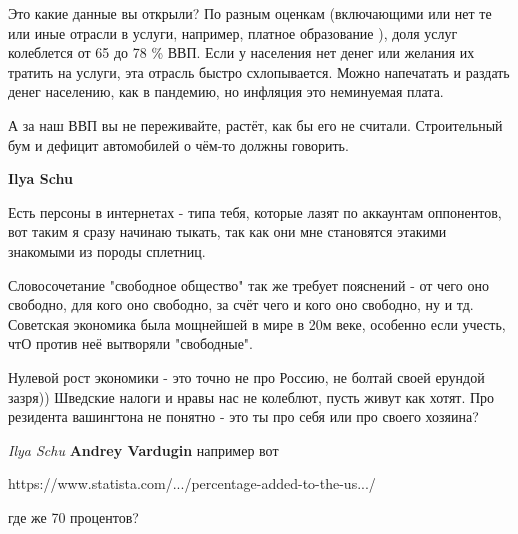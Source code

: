 \begin{itemize}
\begin{itemize}

Это какие данные вы открыли? По разным оценкам (включающими или нет те или иные
отрасли в услуги, например, платное образование ), доля услуг колеблется от 65
до 78 \% ВВП. Если у населения нет денег или желания их тратить на услуги, эта
отрасль быстро схлопывается. Можно напечатать и раздать денег населению, как в
пандемию, но инфляция это неминуемая плата.

А за наш ВВП вы не переживайте, растёт, как бы его не считали. Строительный бум
и дефицит автомобилей о чём-то должны говорить.

\textbf{Ilya Schu} 

Есть персоны в интернетах - типа тебя, которые лазят по аккаунтам оппонентов,
вот таким я сразу начинаю тыкать, так как они мне становятся этакими знакомыми
из породы сплетниц.

Словосочетание "свободное общество" так же требует пояснений - от чего оно
свободно, для кого оно свободно, за счёт чего и кого оно свободно, ну и тд.
Советская экономика была мощнейшей в мире в 20м веке, особенно если учесть, чтО
против неё вытворяли "свободные".

Нулевой рост экономики - это точно не про Россию, не болтай своей ерундой
зазря)) Шведские налоги и нравы нас не колеблют, пусть живут как хотят. Про
резидента вашингтона не понятно - это ты про себя или про своего хозяина?

\emph{Ilya Schu}
\textbf{Andrey Vardugin} например вот 

https://www.statista.com/.../percentage-added-to-the-us.../ 

где же 70 процентов?


\end{itemize} %


\end{itemize} %
